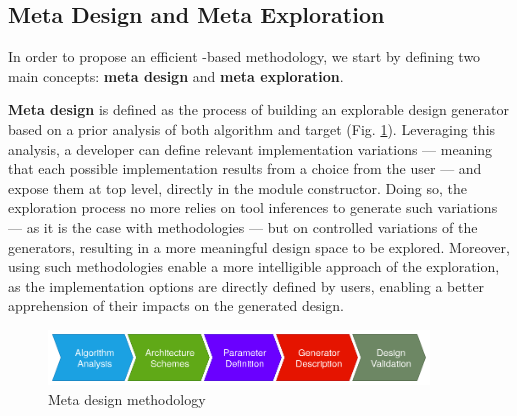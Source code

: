     \subsection{Meta Design and Meta Exploration}
    \label{ch.dse:sec.definition:ssec.meta}
        In order to propose an efficient -based  methodology, we start by defining two main concepts: {\bf meta design} and {\bf meta exploration}.

        {\bf Meta design} is defined as the process of building an explorable design generator based on a prior analysis of both algorithm and target (Fig. \ref{ch.dse:sec.definition:ssec.meta:fig.meta-design}).
        Leveraging this analysis, a developer can define relevant implementation variations --- meaning that each possible implementation results from a choice from the user --- and expose them at top level, directly in the module constructor.
        Doing so, the exploration process no more relies on tool inferences to generate such variations --- \eg as it is the case with  methodologies --- but on controlled variations of the generators, resulting in a more meaningful design space to be explored.
        Moreover, using such methodologies enable a more intelligible approach of the exploration, as the implementation options are directly defined by users, enabling a better apprehension of their impacts on the generated design.
        
        \begin{figure}[h!]
            \centering
            \includegraphics[width=0.9\textwidth]{Figures/Methodology-metadesign}
            \caption{Meta design methodology}
            \label{ch.dse:sec.definition:ssec.meta:fig.meta-design}
        \end{figure}

